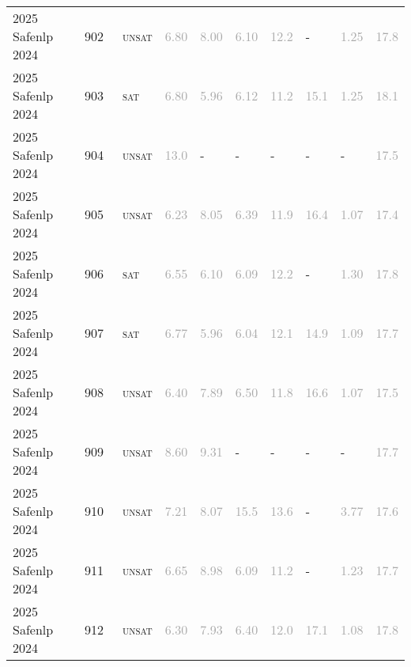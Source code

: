 \begin{center}
{\begin{longtable}{@{}llllllllll@{}}
2025 Safenlp 2024 & 902 & ~\textsc{unsat} & \textcolor{darkgray}{6.80} & \textcolor{darkgray}{8.00} & \textcolor{darkgray}{6.10} & \textcolor{darkgray}{12.2} & - & \textcolor{darkgray}{1.25} & \textcolor{darkgray}{17.8} \\
2025 Safenlp 2024 & 903 & ~\textsc{sat} & \textcolor{darkgray}{6.80} & \textcolor{darkgray}{5.96} & \textcolor{darkgray}{6.12} & \textcolor{darkgray}{11.2} & \textcolor{darkgray}{15.1} & \textcolor{darkgray}{1.25} & \textcolor{darkgray}{18.1} \\
2025 Safenlp 2024 & 904 & ~\textsc{unsat} & \textcolor{darkgray}{13.0} & - & - & - & - & - & \textcolor{darkgray}{17.5} \\
2025 Safenlp 2024 & 905 & ~\textsc{unsat} & \textcolor{darkgray}{6.23} & \textcolor{darkgray}{8.05} & \textcolor{darkgray}{6.39} & \textcolor{darkgray}{11.9} & \textcolor{darkgray}{16.4} & \textcolor{darkgray}{1.07} & \textcolor{darkgray}{17.4} \\
2025 Safenlp 2024 & 906 & ~\textsc{sat} & \textcolor{darkgray}{6.55} & \textcolor{darkgray}{6.10} & \textcolor{darkgray}{6.09} & \textcolor{darkgray}{12.2} & - & \textcolor{darkgray}{1.30} & \textcolor{darkgray}{17.8} \\
2025 Safenlp 2024 & 907 & ~\textsc{sat} & \textcolor{darkgray}{6.77} & \textcolor{darkgray}{5.96} & \textcolor{darkgray}{6.04} & \textcolor{darkgray}{12.1} & \textcolor{darkgray}{14.9} & \textcolor{darkgray}{1.09} & \textcolor{darkgray}{17.7} \\
2025 Safenlp 2024 & 908 & ~\textsc{unsat} & \textcolor{darkgray}{6.40} & \textcolor{darkgray}{7.89} & \textcolor{darkgray}{6.50} & \textcolor{darkgray}{11.8} & \textcolor{darkgray}{16.6} & \textcolor{darkgray}{1.07} & \textcolor{darkgray}{17.5} \\
2025 Safenlp 2024 & 909 & ~\textsc{unsat} & \textcolor{darkgray}{8.60} & \textcolor{darkgray}{9.31} & - & - & - & - & \textcolor{darkgray}{17.7} \\
2025 Safenlp 2024 & 910 & ~\textsc{unsat} & \textcolor{darkgray}{7.21} & \textcolor{darkgray}{8.07} & \textcolor{darkgray}{15.5} & \textcolor{darkgray}{13.6} & - & \textcolor{darkgray}{3.77} & \textcolor{darkgray}{17.6} \\
2025 Safenlp 2024 & 911 & ~\textsc{unsat} & \textcolor{darkgray}{6.65} & \textcolor{darkgray}{8.98} & \textcolor{darkgray}{6.09} & \textcolor{darkgray}{11.2} & - & \textcolor{darkgray}{1.23} & \textcolor{darkgray}{17.7} \\
2025 Safenlp 2024 & 912 & ~\textsc{unsat} & \textcolor{darkgray}{6.30} & \textcolor{darkgray}{7.93} & \textcolor{darkgray}{6.40} & \textcolor{darkgray}{12.0} & \textcolor{darkgray}{17.1} & \textcolor{darkgray}{1.08} & \textcolor{darkgray}{17.8} \\

\end{longtable}}
\end{center}
